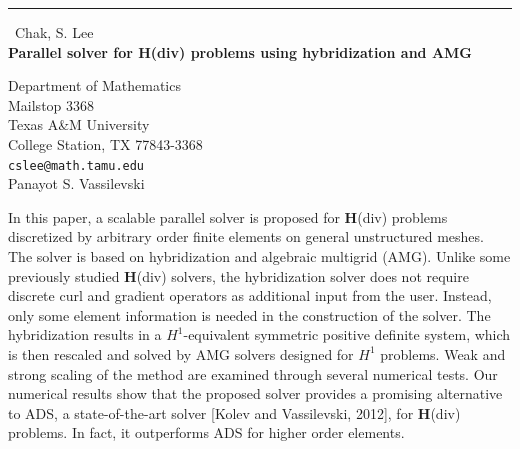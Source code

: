 \documentclass{report}
\begin{document}
\begin{center}
\rule{6in}{1pt} \
{\large Chak, S. Lee \\
{\bf Parallel solver for H(div) problems using hybridization and AMG}}

Department of Mathematics \\
Mailstop 3368 \\
Texas A\&M University \\
College Station, TX 77843-3368 \\
{\tt cslee@math.tamu.edu}\\
Panayot S. Vassilevski\end{center}

In this paper, a scalable parallel solver is proposed for ${\boldsymbol
H}$(div) problems discretized by arbitrary order finite elements on
general unstructured meshes. The solver is based on hybridization and
algebraic multigrid (AMG). Unlike some previously studied ${\boldsymbol
H}$(div) solvers, the hybridization solver does not require discrete curl
and gradient operators as additional input from the user. Instead, only
some element information is needed in the construction of the solver. The
hybridization results in a $H^1$-equivalent symmetric positive definite
system, which is then rescaled and solved by AMG solvers designed for
$H^1$ problems. Weak and strong scaling of the method are examined
through several numerical tests. Our numerical results show that the
proposed solver provides a promising alternative to ADS, a
state-of-the-art solver [Kolev and Vassilevski, 2012], for ${\boldsymbol
H}$(div) problems. In fact, it outperforms ADS for higher order elements.
\end{document}
